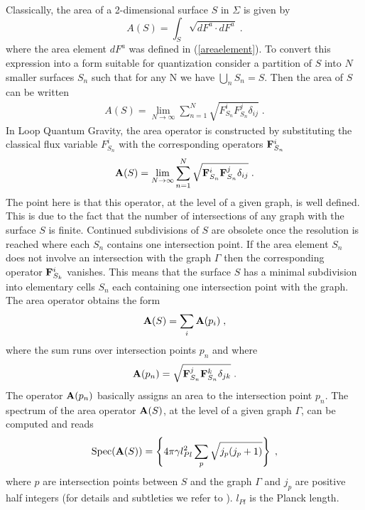 \documentclass[12pt]{article}
\newcommand{\ba}{\begin{eqnarray}}
\newcommand{\ea}{\end{eqnarray}}
\def\d{\delta}
\def\e{\epsilon}
\def\p{\pi}
\def\G{\Gamma}
\def\S{\Sigma}
\begin{document}
Classically, the area of a 2-dimensional surface $S$ in $\S$ is given by
\[
A(S)=\int_S \sqrt{dF^a\cdot dF^a}\;.
\]
where the area element $dF^a$ was defined in (\ref{areaelement}). To convert this expression into a form suitable for quantization
consider a partition of $S$ into $N$ smaller surfaces $S_n$ such that for any N we have $\bigcup_n S_n=S$. Then the area of $S$ can be written
\ba 
A(S)=\lim_{N\rightarrow \infty}\sum_{n=1}^N \sqrt{F^i_{S_n}F^j_{S_n}\d_{ij}}\;.
\label{clasarea}
\ea
In Loop Quantum Gravity, the area operator is constructed by substituting the classical flux variable $F^i_{S_n}$ with the corresponding operators ${\bf F}^i_{S_n}$
\ba 
{\bf A}(S)=  \lim_{N\rightarrow \infty}\sum_{n=1}^N \sqrt{{\bf F}^i_{S_n}{\bf F}^j_{S_n}\d_{ij}}\;.
\label{areaI}
\ea
The point here is that this operator, at the level of a given graph, is well defined. This is due to the fact that the number of intersections of any graph with the surface $S$ is finite. Continued subdivisions of $S$ are obsolete once the resolution is reached where each $S_n$ contains one intersection point. If the area element $S_n$ does not involve an intersection with the graph $\G$ then the corresponding operator ${\bf F}^i_{S_k}$ vanishes. This means that the surface $S$ has a minimal subdivision into elementary cells $S_n$ each containing one intersection point with the graph. The area operator obtains the form
\[
{\bf A}(S)=  \sum_i {\bf A}(p_i)\;,
\]
where the sum runs over intersection points $p_n$ and where
\ba 
{\bf A}(p_n)= \sqrt{{\bf F}^j_{S_n}{\bf F}^k_{S_n}\d_{jk}}\;.
\label{SE2}
\ea
The operator ${\bf A}(p_n)$ basically assigns an area to the intersection point $p_n$.
The spectrum of the area operator ${\bf A}(S)$, at the level of a given graph $\G$, can be computed and reads \cite{Ashtekar:2004eh}
\[
\mbox{Spec}({\bf A}(S)) = \left\{4\p \gamma l^2_{Pl}\sum_{p}\sqrt{j_p(j_p + 1)}\right\}\;,
\]
where $p$ are intersection points between $S$ and the graph $\G$ and $j_p$ are positive half integers (for details and subtleties we refer to \cite{Ashtekar:2004eh}). $l_{Pl}$ is the Planck length.


\end{document}
